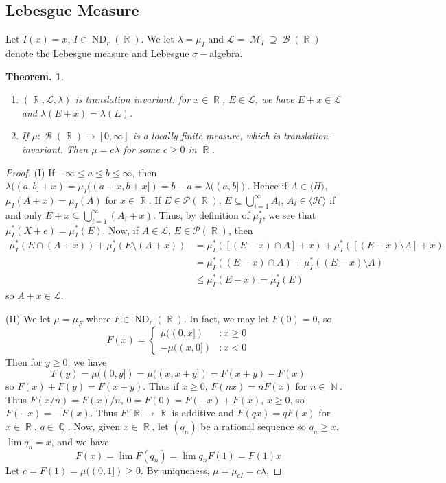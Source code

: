 \documentclass[11pt, a4paper]{memoir}
\DeclareMathOperator{\N}{{\mathbb{N}}}
\DeclareMathOperator{\Q}{{\mathbb{Q}}}
\DeclareMathOperator{\R}{{\mathbb{R}}}
\theoremstyle{change}
\newtheorem{theorem}{Theorem.}[section]
\theoremstyle{plain}
\theoremstyle{nonumberplain}
\newtheorem{proof}{Proof}
\DeclareMathOperator{\M}{{\mathcal{M}}}
\DeclareMathOperator{\B}{{\mathcal{B}}}
\DeclareMathOperator{\ND}{ND}
\begin{document}
\subsection{Lebesgue Measure}
Let $I(x)=x$, $I\in\ND_r(\R)$.
We let $\lambda=\mu_I$ and $\mathcal{L}=\M_I\supseteq\B(\R)$ denote the Lebesgue measure and Lebesgue $\sigma-$algebra.
\begin{theorem}
    \begin{enumerate}[nolistsep]
        \item $(\R,\mathcal{L},\lambda)$ is translation invariant: for $x\in\R$, $E\in\mathcal{L}$, we have $E+x\in\mathcal{L}$ and $\lambda(E+x)=\lambda(E)$.
        \item If $\mu:\B(\R)\to[0,\infty]$ is a locally finite measure, which is translation-invariant.
            Then $\mu=c\lambda$ for some $c\geq 0$ in $\R$.
    \end{enumerate}
\end{theorem}
\begin{proof}
    (I) If $-\infty\leq a\leq b\leq\infty$, then $\lambda((a,b]+x)=\mu_I((a+x,b+x])=b-a=\lambda((a,b])$.
    Hence if $A\in\langle H\rangle$, $\mu_I(A+x)=\mu_I(A)$ for $x\in\R$.
    If $E\in\mathcal{P}(\R)$, $E\subseteq\bigcup_{i=1}^\infty A_i$, $A_i\in\langle\mathcal{H}\rangle$ if and only $E+x\subseteq\bigcup_{i=1}^\infty(A_i+x)$.
    Thus, by definition of $\mu_I^*$, we see that $\mu_I^*(X+e)=\mu_I^*(E)$.
    Now, if $A\in\mathcal{L}$, $E\in\mathcal{P}(\R)$, then
    \begin{align*}
        \mu_I^*(E\cap (A+x))+\mu_I^*(E\setminus(A+x)) &= \mu_I^*([(E-x)\cap A]+x)+\mu_I^*([(E-x)\setminus A]+x)\\
                                                      &= \mu_I^*((E-x)\cap A)+\mu_I^*((E-x)\setminus A)\\
                                                      &\leq \mu_I^*(E-x)=\mu_I^*(E)
    \end{align*}
    so $A+x\in\mathcal{L}$.
    
    (II) We let $\mu=\mu_F$ where $F\in\ND_r(\R)$.
    In fact, we may let $F(0)=0$, so
    \begin{equation*}
        F(x)=\begin{cases} \mu((0,x]) &:x\geq 0\\-\mu((x,0])&:x<0\end{cases}
    \end{equation*}
    Then for $y\geq 0$, we have
    \begin{equation*}
        F(y)=\mu((0,y])=\mu((x,x+y])=F(x+y)-F(x)
    \end{equation*}
    so $F(x)+F(y)=F(x+y)$.
    Thus if $x\geq 0$, $F(nx)=nF(x)$ for $n\in\N$.
    Thus $F(x/n)=F(x)/n$, $0=F(0)=F(-x)+F(x)$, $x\geq 0$, so $F(-x)=-F(x)$.
    Thus $F:\R\to\R$ is additive and $F(qx)=qF(x)$ for $x\in\R$, $q\in\Q$.
    Now, given $x\in\R$, let $(q_n)$ be a rational sequence so $q_n\geq x$, $\lim q_n=x$, and we have
    \begin{equation*}
        F(x)=\lim F(q_n)=\lim q_nF(1)=F(1)x
    \end{equation*}
    Let $c=F(1)=\mu((0,1])\geq 0$.
    By uniqueness, $\mu=\mu_{cI}=c\lambda$.
\end{proof}
\end{document}
